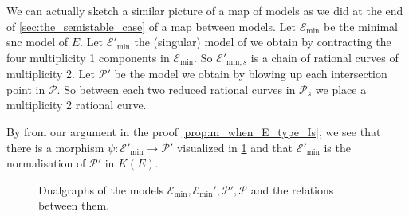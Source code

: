 We can actually sketch a similar picture of a map of models as we did at the end of \cref{sec:the_semistable_case} of a map between models. 
Let $\mathscr E_\text{min} $ be the minimal snc model of $E$. 
Let $\mathscr E'_{\text{min}}$ the (singular) model of we obtain by contracting the four multiplicity 1 components in  $\mathscr E_\text{min} $. 
So $\mathscr E'_{\text{min}, s} $ is a chain of rational curves of multiplicity 2. 
Let $\mathscr P'$ be the model we obtain by blowing up each intersection point in $\mathscr P$. 
So between each two reduced rational curves in $\mathscr P_s$ we place a multiplicity 2 rational curve.

By from our argument in the proof \cref{prop:m_when_E_type_Is}, we see that there is a morphism $\psi: \mathscr E'_\text{min}  \to \mathscr P'$ visualized in \cref{fig:dualgraphs_is_models} and that $\mathscr E'_\text{min} $ is the normalisation of $\mathscr P'$ in  $K(E)$. 
\begin{figure}[ht]
    \centering
    \caption{Dualgraphs of the models $\mathscr E_\text{min} , \mathscr E_\text{min} ', \mathscr P', \mathscr P$ and the relations between them.}
    \label{fig:dualgraphs_is_models}
\end{figure}

